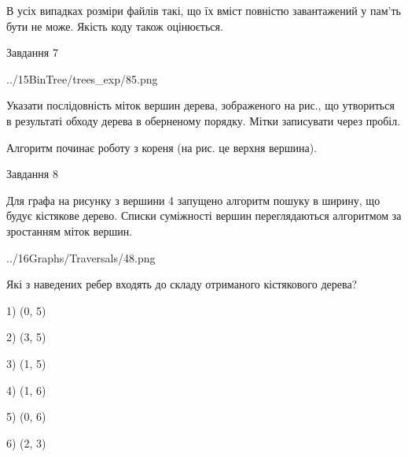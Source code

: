 \documentclass[12pt, ukrainian]{article}
\begin{document}
{В усіх випадках розміри файлів такі, що їх вміст повністю завантажений у пам'ть бути не може. Якість коду також оцінюється.



\vspace{10mm}\par

\newpage
\begin{minipage}[t]{9.7cm}
               
{\begin{center}Завдання {7}\end{center}}
\vspace{-4mm}

\begin{center}
	{../15BinTree/trees_exp/85.png}
\end{center}
Указати послідовність міток вершин дерева, зображеного на рис., що утвориться в результаті обходу дерева в оберненому порядку. Мітки записувати через пробіл.\par Алгоритм починає роботу з кореня (на рис. це верхня вершина).\par

\end{minipage}
\vline \hspace{8mm}
\begin{minipage}[t]{8.0cm}
               
{\begin{center}Завдання {8}\end{center}}
\vspace{-4mm}
Для графа на рисунку з вершини 4 запущено алгоритм пошуку в ширину, що будує кістякове дерево. Списки суміжності вершин переглядаються алгоритмом за зростанням міток вершин.\par
\begin{center}
	{../16Graphs/Traversals/48.png}
\end{center}
\par Які з наведених ребер входять до складу отриманого кістякового дерева?\par
1) (0, 5)\par
2) (3, 5)\par
3) (1, 5)\par
4) (1, 6)\par
5) (0, 6)\par
6) (2, 3)\par
{\vskip 15pt} \par


\end{minipage}}
\end{document}
